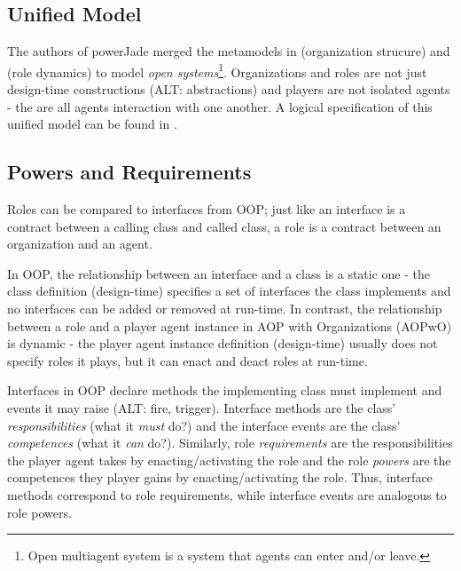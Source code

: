 \subsection*{Unified Model}

The authors of powerJade merged the metamodels in \cite{Boella04} (organization strucure) and \cite{Boella04} (role dynamics) to model \textit{open systems}\footnote{Open multiagent system is a system that agents can enter and/or leave.}.
Organizations and roles are not just design-time constructions (ALT: abstractions) and players are not isolated agents - the are all agents interaction with one another.
A logical specification of this unified model can be found in \cite{Boella07}.

\subsection*{Powers and Requirements}

Roles can be compared to interfaces from OOP; just like an interface is a contract between a calling class and called class, a role is a contract between an organization and an agent.

In OOP, the relationship between an interface and a class is a static one - the class definition (design-time) specifies a set of interfaces the class implements and no interfaces can be added or removed at run-time.
In contrast, the relationship between a role and a player agent instance in AOP with Organizations (AOPwO) is dynamic - the player agent instance definition (design-time) usually does not specify roles it plays, but it can enact and deact roles at run-time.

Interfaces in OOP declare methods the implementing class must implement and events it may raise (ALT: fire, trigger).
Interface methods are the class' \textit{responsibilities} (what it \textit{must} do?) and the interface events are the class' \textit{competences} (what it \textit{can} do?).
Similarly, role \textit{requirements} are the responsibilities the player agent takes by enacting/activating the role and the role \textit{powers} are the competences they player gains by enacting/activating the role.
Thus, interface methods correspond to role requirements, while interface events are analogous to role powers.